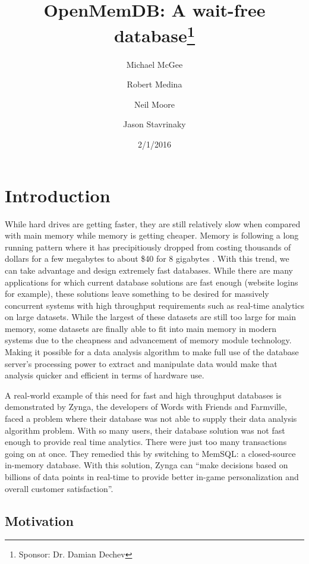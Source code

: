 \documentclass[letter,11pt]{article}
\title{OpenMemDB: A wait-free database\thanks{Sponsor: Dr. Damian Dechev}}
\author{Michael McGee \and Robert Medina \and Neil Moore \and Jason Stavrinaky}
\date{2/1/2016}
\begin{document}
\maketitle
\newpage

\tableofcontents
\newpage


\section{Introduction}
While hard drives are getting faster, they are still relatively slow when compared 
with main memory while memory is getting cheaper. Memory is following a long running 
pattern where it has precipitiously dropped from costing thousands of dollars for a few 
megabytes to about \$40 for 8 gigabytes \cite{jcmit}. With this trend, we can take 
advantage and design extremely fast databases. While there are many applications for 
which current database solutions are fast enough (website logins for example), these 
solutions leave something to be desired for massively concurrent systems with high throughput
requirements such as real-time analytics on large datasets. While the largest of 
these datasets are still too large for main memory, some datasets are finally able
to fit into main memory in modern systems due to the cheapness and advancement of 
memory module technology. Making it possible for a data analysis algorithm to make 
full use of the database server's processing power to extract and manipulate data
would make that analysis quicker and efficient in terms of hardware use.
\par\vspace{\baselineskip}
A real-world example of this need for fast and high throughput databases is demonstrated by Zynga, 
the developers of Words with Friends and Farmville, faced a problem where their 
database was not able to supply their data analysis algorithm problem. With so 
many users, their database solution was not fast enough to provide real time analytics. 
There were just too many transactions going on at once. They 
remedied this by switching to MemSQL: a closed-source in-memory database. With this 
solution, Zynga can ``make decisions based on billions of data points in real-time to 
provide better in-game personalization and overall customer satisfaction''. \cite{MemSQL} 

\subsection{Motivation}
\end{document}
